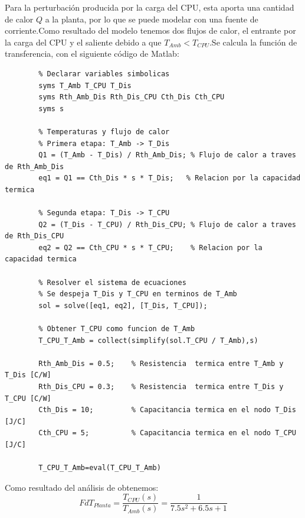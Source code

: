 \documentclass[12pt]{article}
\begin{document}
	 Para la perturbación producida por la carga del CPU, esta aporta una cantidad de calor $Q$ a la planta, por lo que se puede modelar con una fuente de corriente.Como resultado del modelo tenemos dos flujos de calor, el entrante por la carga del CPU y el saliente debido a que $T_{Amb}<T_{CPU}$.Se calcula la función de transferencia, con el siguiente código de Matlab:
	
	\begin{lstlisting}
		% Declarar variables simbolicas
		syms T_Amb T_CPU T_Dis 
		syms Rth_Amb_Dis Rth_Dis_CPU Cth_Dis Cth_CPU
		syms s
		
		% Temperaturas y flujo de calor
		% Primera etapa: T_Amb -> T_Dis
		Q1 = (T_Amb - T_Dis) / Rth_Amb_Dis; % Flujo de calor a traves de Rth_Amb_Dis
		eq1 = Q1 == Cth_Dis * s * T_Dis;   % Relacion por la capacidad termica
		
		% Segunda etapa: T_Dis -> T_CPU
		Q2 = (T_Dis - T_CPU) / Rth_Dis_CPU; % Flujo de calor a traves de Rth_Dis_CPU
		eq2 = Q2 == Cth_CPU * s * T_CPU;    % Relacion por la capacidad termica
		
		% Resolver el sistema de ecuaciones
		% Se despeja T_Dis y T_CPU en terminos de T_Amb
		sol = solve([eq1, eq2], [T_Dis, T_CPU]);
		
		% Obtener T_CPU como funcion de T_Amb
		T_CPU_T_Amb = collect(simplify(sol.T_CPU / T_Amb),s)
		
		Rth_Amb_Dis = 0.5;    % Resistencia  termica entre T_Amb y T_Dis [C/W]
		Rth_Dis_CPU = 0.3;    % Resistencia  termica entre T_Dis y T_CPU [C/W]
		Cth_Dis = 10;         % Capacitancia termica en el nodo T_Dis [J/C]
		Cth_CPU = 5;          % Capacitancia termica en el nodo T_CPU [J/C]
		
		T_CPU_T_Amb=eval(T_CPU_T_Amb)
	\end{lstlisting}
	
	Como resultado del análisis de obtenemos:
	\begin{equation}
		FdT_{Planta}=\frac{T_{CPU}(s)}{T_{Amb}(s)}=\frac{1}{7.5s^2+6.5s+1}
	\end{equation}
	
	
\end{document}
